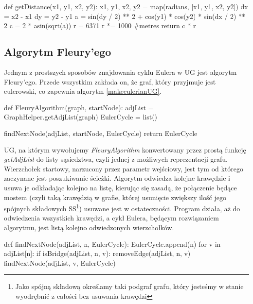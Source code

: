\documentclass[a4paper, 12pt, twoside, openright]{article}
\begin{document}
\begin{algorithm}[caption={\textit{getDistance} funkcja obliczająca odległości między rzeczywistymi budynkami, generująca wagi dla krawędzi. Przy jej implementacji sugerowano się wzorami \ref{haversie} -  \ref{haversieD}.}, label={getDistance}]
def getDistance(x1, y1, x2, y2):
	x1, y1, x2, y2 = map(radians, [x1, y1, x2, y2])
	dx = x2 - x1
	dy = y2 - y1
	a = sin(dy / 2) ** 2 + cos(y1) * cos(y2) * sin(dx / 2) ** 2
	c = 2 * asin(sqrt(a))
	r = 6371
	r *= 1000	#metres
	return c * r
\end{algorithm}


\newpage
\subsection{Algorytm Fleury’ego} \label{FleuryAlgo}
\indent\par
	Jednym z prostszych sposobów znajdowania cyklu Eulera w UG jest algorytm Fleury'ego. Przede wszystkim zakłada on, że graf, który przyjmuje jest eulerowski, co zapewnia algorytm \ref{makeeulerianUG}. 
\begin{algorithm}[caption={\textit{FleuryAlgorithm} wyszukujący ścieżkę w grafie nieskierowanym}, label={FleuryAlgorithm}]
	def FleuryAlgorithm(graph, startNode):
	adjList = GraphHelper.getAdjList(graph)
	EulerCycle = list()
	
	findNextNode(adjList, startNode, EulerCycle)
	return EulerCycle
\end{algorithm}	
	UG, na którym wywołujemy \textit{FleuryAlgorithm} konwertowany przez prostą funkcję \textit{getAdjList} do listy sąsiedztwa, czyli jednej z możliwych reprezentacji grafu. Wierzchołek startowy, narzucony przez parametr wejściowy, jest tym od którego zaczynane jest poszukiwanie ścieżki. Algorytm odwiedza kolejne krawędzie i usuwa je odkładając kolejno na listę, kierując się zasadą, że połączenie będące mostem (czyli taką krawędzią w grafie, której usunięcie zwiększy ilość jego spójnych składowych SS\footnote{ Jako spójną składową określamy taki podgraf grafu, który jesteśmy w stanie wyodrębnić z całości bez usuwania krawędzi}) usuwane jest w ostateczności. Program działa, aż do odwiedzenia wszystkich krawędzi, a cykl Eulera, będącym rozwiązaniem algorytmu, jest listą kolejno odwiedzonych wierzchołków.

\begin{algorithm}[caption={\textit{findNextNode} rekurencyjna funkcja pomocnicza dla \textit{FleuryAlgorithm} }, label={findNextNode}]
	def findNextNode(adjList, n, EulerCycle):
	EulerCycle.append(n)
	for v in adjList[n]:
	if isBridge(adjList, n, v):
	removeEdge(adjList, n, v)
	findNextNode(adjList, v, EulerCycle)
\end{algorithm}
\end{document}
